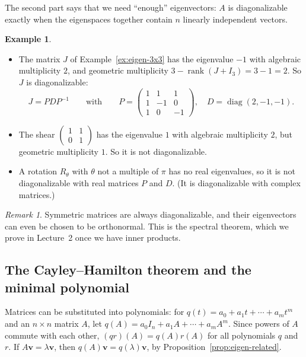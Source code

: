 \documentclass[11pt]{article}
\theoremstyle{definition}
\newtheorem{example}[definition]{Example}
\theoremstyle{plain}
\theoremstyle{remark}
\newtheorem{remark}[definition]{Remark}
\DeclareMathOperator{\rank}{rank}
\DeclareMathOperator{\diag}{diag}
\begin{document}
The second part says that we need ``enough'' eigenvectors: $A$ is diagonalizable exactly when the eigenspaces together contain $n$ linearly independent vectors.

\begin{example}
    \begin{itemize}
        \item The matrix $J$ of Example~\ref{ex:eigen-3x3} has the eigenvalue $-1$ with algebraic multiplicity $2$, and geometric multiplicity $3 - \rank(J + I_3) = 3 - 1 = 2$. So $J$ is diagonalizable:
        \[J = PDP^{-1} \qquad \text{with} \qquad P = \begin{pmatrix} 1 & 1 & 1 \\ 1 & -1 & 0 \\ 1 & 0 & -1 \end{pmatrix}, \quad D = \diag(2, -1, -1).\]
        \item The shear $\begin{pmatrix} 1 & 1 \\ 0 & 1 \end{pmatrix}$ has the eigenvalue $1$ with algebraic multiplicity $2$, but geometric multiplicity $1$. So it is not diagonalizable.
        \item A rotation $R_\theta$ with $\theta$ not a multiple of $\pi$ has no real eigenvalues, so it is not diagonalizable with real matrices $P$ and $D$. (It is diagonalizable with complex matrices.)
    \end{itemize}
\end{example}

\begin{remark}
    Symmetric matrices are always diagonalizable, and their eigenvectors can even be chosen to be orthonormal. This is the spectral theorem, which we prove in Lecture~2 once we have inner products.
\end{remark}

\subsection{The Cayley--Hamilton theorem and the minimal polynomial}\label{subsec:cayley-hamilton}

Matrices can be substituted into polynomials: for $q(t) = a_0 + a_1t + \cdots + a_mt^m$ and an $n \times n$ matrix $A$, let $q(A) = a_0I_n + a_1A + \cdots + a_mA^m$. Since powers of $A$ commute with each other, $(qr)(A) = q(A)r(A)$ for all polynomials $q$ and $r$. If $A\mathbf{v} = \lambda\mathbf{v}$, then $q(A)\mathbf{v} = q(\lambda)\mathbf{v}$, by Proposition~\ref{prop:eigen-related}.
\end{document}

